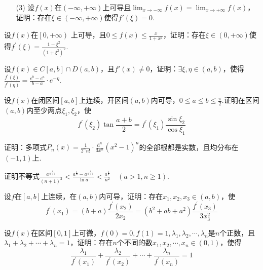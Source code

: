 \begin{xiti}
\begin{enumerate}
		\item[(3)] 设$f(x)$在$(-\infty,+\infty)$上可导且$\lim _ { x \rightarrow - \infty } f ( x ) = \lim _ { x \rightarrow + \infty } f ( x )$，证明：存在$\xi \in(-\infty,+\infty)$使得$f'(\xi )=0$.
	\end{enumerate}
	\item 设$f(x)$在$\left[ 0,+\infty\right) $ 上可导，且$0 \leqslant f ( x ) \leqslant \frac { x } { 1 + x ^ { 2 } }$，证明：存在$\xi \in ( 0 , + \infty )$使得$f ^ { \prime } ( \xi ) = \frac { 1 - \xi ^ { 2 } } { \left( 1 + \xi ^ { 2 } \right) ^ { 2 } }$.
	\item 设$f ( x ) \in C [ a , b ] \cap D ( a , b )$，且$f'(x)\ne 0$，证明：$\exists \xi , \eta \in ( a , b )$，使得$\frac { f ^ { \prime } ( \xi ) } { f ^ { \prime } ( \eta ) } = \frac { e ^ { b } - e ^ { a } } { b - a } \cdot e ^ { - \eta }$.
	\item 设$f(x)$在闭区间$[a,b]$上连续，开区间$(a,b)$内可导，$0\leq a\leq b\leq \frac{\pi}{2}$.证明在区间$(a,b)$内至少两点$\xi_{1},\xi_{2}$，使
	\[f ^ { \prime } \left( \xi _ { 2 } \right) \tan \frac { a + b } { 2 } = f ^ { \prime } \left( \xi _ { 1 } \right) \frac { \sin \xi _ { 2 } } { \cos \xi _ { 1 } }\]
	\item 证明：多项式$P _ { n } ( x ) = \frac { 1 } { 2 ^ { n } n ! } \cdot \frac { \mathrm { d } ^ { n } } { \mathrm { d } x ^ { n } } \left( x ^ { 2 } - 1 \right) ^ { n }$的全部根都是实数，且均分布在$(-1,1)$上.
	\item 证明不等式$\frac { a ^ { \frac { 1 } { n + 1 } } } { ( n + 1 ) ^ { 2 } } < \frac { a ^ { \frac { 1 } { n } } - a ^ { \frac { 1 } { n + 1 } } } { \ln a } < \frac { a ^ { \frac { 1 } { n } } } { n ^ { 2 } } \quad ( a > 1 , n \geqslant 1 )$.
	\item 设$f$在$[a,b]$上连续，在$(a,b)$内可导，证明：存在$x _ { 1 } , x _ { 2 } , x _ { 3 } \in ( a , b )$，使
	\[f ^ { \prime } \left( x _ { 1 } \right) = ( b + a ) \frac { f ^ { \prime } \left( x _ { 2 } \right) } { 2 x _ { 2 } } = \left( b ^ { 2 } + a b + a ^ { 2 } \right) \frac { f ^ { \prime } \left( x _ { 3 } \right) } { 3 x _ { 3 } ^ { 2 } }\]
	\item 设$f(x)$在区间$[0,1]$上可微，$f ( 0 ) = 0 , f ( 1 ) = 1 , \lambda _ { 1 } , \lambda _ { 2 } , \cdots , \lambda _ { n }$是$n$个正数，且$\lambda _ { 1 } + \lambda _ { 2 } + \cdots + \lambda _ { n } = 1$，证明：存在$n$个不同的数$x _ { 1 } , x _ { 2 } , \cdots , x _ { n } \in ( 0,1 )$，使得
	\[\frac { \lambda _ { 1 } } { f ^ { \prime } \left( x _ { 1 } \right) } + \frac { \lambda _ { 2 } } { f ^ { \prime } \left( x _ { 2 } \right) } + \cdots + \frac { \lambda _ { n } } { f ^ { \prime } \left( x _ { n } \right) } = 1\]

\end{xiti}
